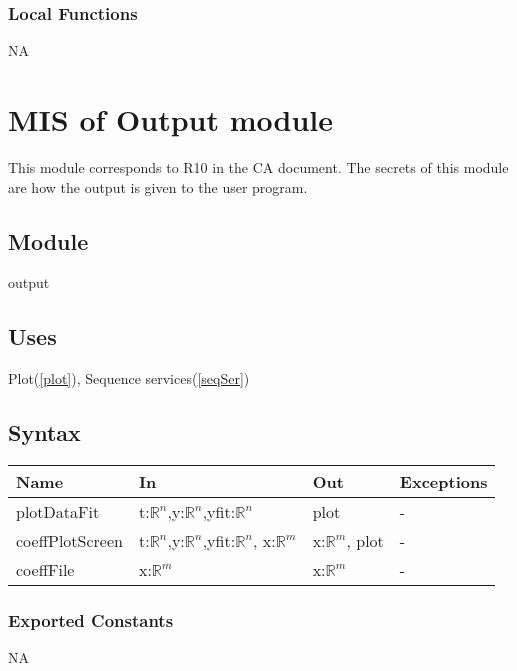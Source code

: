 \documentclass[12pt, titlepage]{article}
\begin{document}
\subsubsection{Local Functions}

NA


\section{MIS of Output module} \label{mOutput}

This module corresponds to R10 in the CA document. The secrets of 
this module are how the output is given to the user program.

\subsection{Module}

output

\subsection{Uses}

Plot(\ref{plot}), Sequence services(\ref{seqSer})

\subsection{Syntax}

\begin{tabular}{p{3cm} p{3cm} p{4cm} >{\raggedright\arraybackslash}p{5cm}}
	\toprule
	\textbf{Name} & \textbf{In} & \textbf{Out} & \textbf{Exceptions} \\
	\midrule
	
	plotDataFit & t:$\mathbb{R}^n$,y:$\mathbb{R}^n$,yfit:$\mathbb{R}^n$ & plot 
	& -  
	\\
	
	coeffPlotScreen & t:$\mathbb{R}^n$,y:$\mathbb{R}^n$,yfit:$\mathbb{R}^n$, 
	x:$\mathbb{R}^m$ & 
	x:$\mathbb{R}^m$, plot &  -\\
	
	coeffFile& x:$\mathbb{R}^m$ & 
	x:$\mathbb{R}^m$ & - \\
	
	\bottomrule
\end{tabular}


\subsubsection{Exported Constants}
NA
\end{document}
